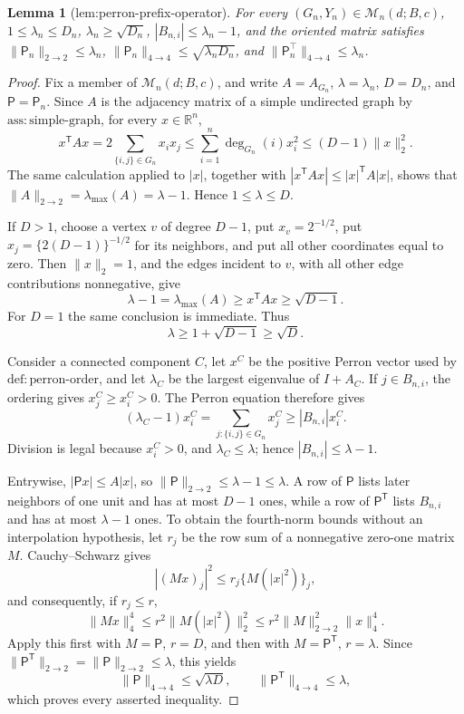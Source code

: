 \documentclass{article}
\newtheorem{lemma}{Lemma}
\begin{document}
\begin{lemma}[lem:perron-prefix-operator]\label{lem:perron-prefix-operator}
For every \((G_n,Y_n)\in\mathcal M_n(d;B,c)\), \(1\le\lambda_n\le D_n\), \(\lambda_n\ge\sqrt{D_n}\), \(|B_{n,i}|\le\lambda_n-1\), and the oriented matrix satisfies \(\|\mathsf P_n\|_{2\to2}\le\lambda_n\), \(\|\mathsf P_n\|_{4\to4}\le\sqrt{\lambda_nD_n}\), and \(\|\mathsf P_n^{\top}\|_{4\to4}\le\lambda_n\).
\end{lemma}
\begin{proof}
Fix a member of \(\mathcal M_n(d;B,c)\), and write \(A=A_{G_n}\), \(\lambda=\lambda_n\), \(D=D_n\), and \(\mathsf P=\mathsf P_n\).  Since \(A\) is the adjacency matrix of a simple undirected graph by \(\mathrm{ass:simple\text{-}graph}\), for every \(x\in\mathbb R^n\),
\[
 x^{\mathsf T}Ax=2\sum_{\{i,j\}\in G_n}x_ix_j
 \le \sum_{i=1}^n\deg_{G_n}(i)x_i^2\le(D-1)\|x\|_2^2.
\]
The same calculation applied to \(|x|\), together with \(|x^{\mathsf T}Ax|\le |x|^{\mathsf T}A|x|\), shows that \(\|A\|_{2\to2}=\lambda_{\max}(A)=\lambda-1\).  Hence \(1\le\lambda\le D\).

If \(D>1\), choose a vertex \(v\) of degree \(D-1\), put \(x_v=2^{-1/2}\), put \(x_j=\{2(D-1)\}^{-1/2}\) for its neighbors, and put all other coordinates equal to zero.  Then \(\|x\|_2=1\), and the edges incident to \(v\), with all other edge contributions nonnegative, give
\[
 \lambda-1=\lambda_{\max}(A)\ge x^{\mathsf T}Ax\ge\sqrt{D-1}.
\]
For \(D=1\) the same conclusion is immediate.  Thus
\[
 \lambda\ge1+\sqrt{D-1}\ge\sqrt D.
\]

Consider a connected component \(C\), let \(x^C\) be the positive Perron vector used by \(\mathrm{def:perron\text{-}order}\), and let \(\lambda_C\) be the largest eigenvalue of \(I+A_C\).  If \(j\in B_{n,i}\), the ordering gives \(x^C_j\ge x^C_i>0\).  The Perron equation therefore gives
\[
 (\lambda_C-1)x^C_i=\sum_{j:\{i,j\}\in G_n}x^C_j
 \ge |B_{n,i}|x^C_i.
\]
Division is legal because \(x^C_i>0\), and \(\lambda_C\le\lambda\); hence \(|B_{n,i}|\le\lambda-1\).

Entrywise, \(|\mathsf Px|\le A|x|\), so \(\|\mathsf P\|_{2\to2}\le\lambda-1\le\lambda\).  A row of \(\mathsf P\) lists later neighbors of one unit and has at most \(D-1\) ones, while a row of \(\mathsf P^{\mathsf T}\) lists \(B_{n,i}\) and has at most \(\lambda-1\) ones.  To obtain the fourth-norm bounds without an interpolation hypothesis, let \(r_j\) be the row sum of a nonnegative zero-one matrix \(M\).  Cauchy--Schwarz gives
\[
 |(Mx)_j|^2\le r_j\{M(|x|^2)\}_j,
\]
and consequently, if \(r_j\le r\),
\[
 \|Mx\|_4^4\le r^2\|M(|x|^2)\|_2^2
 \le r^2\|M\|_{2\to2}^2\|x\|_4^4.
\]
Apply this first with \(M=\mathsf P\), \(r=D\), and then with \(M=\mathsf P^{\mathsf T}\), \(r=\lambda\).  Since \(\|\mathsf P^{\mathsf T}\|_{2\to2}=\|\mathsf P\|_{2\to2}\le\lambda\), this yields
\[
 \|\mathsf P\|_{4\to4}\le\sqrt{\lambda D},\qquad
 \|\mathsf P^{\mathsf T}\|_{4\to4}\le\lambda,
\]
which proves every asserted inequality.
\end{proof}
\end{document}
